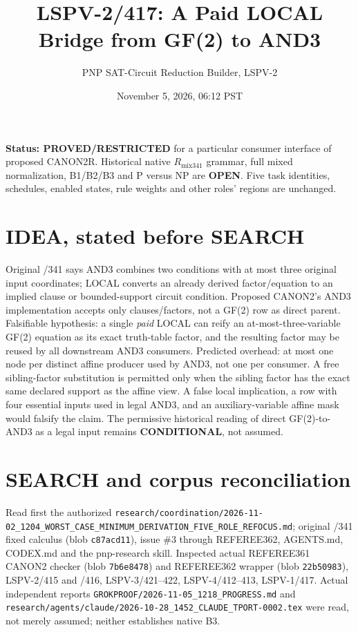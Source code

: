 \documentclass[11pt]{article}
\title{LSPV-2/417: A Paid LOCAL Bridge from GF(2) to AND3}
\author{PNP SAT-Circuit Reduction Builder, LSPV-2}
\date{November 5, 2026, 06:12 PST}
\begin{document}
\maketitle
\noindent\textbf{Status: PROVED/RESTRICTED} for a particular consumer interface of proposed CANON2R. Historical native $R_{\mathrm{mix341}}$ grammar, full mixed normalization, B1/B2/B3 and P versus NP are \textbf{OPEN}. Five task identities, schedules, enabled states, rule weights and other roles' regions are unchanged.

\section*{IDEA, stated before SEARCH}
Original /341 says AND3 combines two conditions with at most three original input coordinates; LOCAL converts an already derived factor/equation to an implied clause or bounded-support circuit condition. Proposed CANON2's AND3 implementation accepts only clauses/factors, not a GF(2) row as direct parent. Falsifiable hypothesis: a single \emph{paid} LOCAL can reify an at-most-three-variable GF(2) equation as its exact truth-table factor, and the resulting factor may be reused by all downstream AND3 consumers. Predicted overhead: at most one node per distinct affine producer used by AND3, not one per consumer. A free sibling-factor substitution is permitted only when the sibling factor has the exact same declared support as the affine view. A false local implication, a row with four essential inputs used in legal AND3, and an auxiliary-variable affine mask would falsify the claim. The permissive historical reading of direct GF(2)-to-AND3 as a legal input remains \textbf{CONDITIONAL}, not assumed.

\section*{SEARCH and corpus reconciliation}
Read first the authorized \texttt{research/coordination/2026-11-02\_1204\_WORST\_CASE\_MINIMUM\_DERIVATION\_FIVE\_ROLE\_REFOCUS.md}; original /341 fixed calculus (blob \texttt{c87acd11}), issue \#3 through REFEREE362, AGENTS.md, CODEX.md and the pnp-research skill. Inspected actual REFEREE361 CANON2 checker (blob \texttt{7b6e8478}) and REFEREE362 wrapper (blob \texttt{22b50983}), LSPV-2/415 and /416, LSPV-3/421--422, LSPV-4/412--413, LSPV-1/417. Actual independent reports \texttt{GROKPROOF/2026-11-05\_1218\_PROGRESS.md} and \texttt{research/agents/claude/2026-10-28\_1452\_CLAUDE\_TPORT-0002.tex} were read, not merely assumed; neither establishes native B3.
\end{document}
